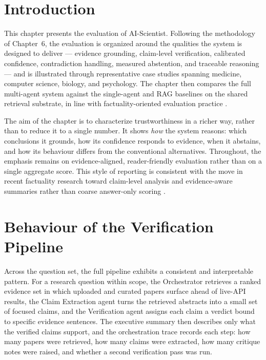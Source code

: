 \section{Introduction }

This chapter presents the evaluation of AI-Scientist. Following the methodology of Chapter~6, the evaluation is
organized around the qualities the system is designed to deliver --- evidence grounding, claim-level verification,
calibrated confidence, contradiction handling, measured abstention, and traceable reasoning --- and is illustrated
through representative case studies spanning medicine, computer science, biology, and psychology. The chapter then
compares the full multi-agent system against the single-agent and RAG baselines on the shared retrieval substrate,
in line with factuality-oriented evaluation practice \cite{thorne2018fever,wadden2020scifact,min2023factscore}.

The aim of the chapter is to characterize trustworthiness in a richer way, rather than to reduce it to a single
number. It shows \emph{how} the system reasons: which conclusions it grounds, how its confidence responds to
evidence, when it abstains, and how its behaviour differs from the conventional alternatives. Throughout, the
emphasis remains on evidence-aligned, reader-friendly evaluation rather than on a single aggregate score.
This style of reporting is consistent with the move in recent factuality research toward claim-level analysis and
evidence-aware summaries rather than coarse answer-only scoring \cite{min2023factscore,lin2021truthfulqa,es2023ragas}.

\section{Behaviour of the Verification Pipeline }

Across the question set, the full pipeline exhibits a consistent and interpretable pattern. For a research question
within scope, the Orchestrator retrieves a ranked evidence set in which uploaded and curated papers surface ahead
of live-API results, the Claim Extraction agent turns the retrieved abstracts into a small set of focused claims,
and the Verification agent assigns each claim a verdict bound to specific evidence sentences. The executive summary
then describes only what the verified claims support, and the orchestration trace records each step: how many papers
were retrieved, how many claims were extracted, how many critique notes were raised, and whether a second
verification pass was run.

